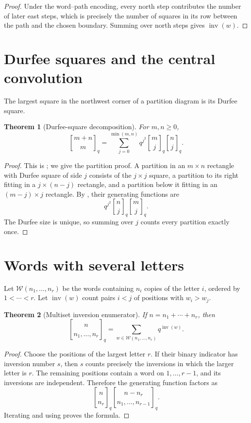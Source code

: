 \documentclass[11pt,oneside,openany]{book}
\newtheorem{theorem}{Theorem}[chapter]
\theoremstyle{definition}
\theoremstyle{remark}
\newcommand{\qbinom}[2]{\genfrac{[}{]}{0pt}{}{#1}{#2}_{q}}
\newcommand{\Qbinom}[3]{\genfrac{[}{]}{0pt}{}{#1}{#2}_{#3}}
\newcommand{\inv}{\operatorname{inv}}
\begin{document}
\begin{proof}
Under the word--path encoding, every north step contributes the number of later east steps, which is precisely the number of squares in its row between the path and the chosen boundary.  Summing over north steps gives $\inv(w)$.
\end{proof}

\section{Durfee squares and the central convolution}

The largest square in the northwest corner of a partition diagram is its Durfee square.

\begin{theorem}[Durfee-square decomposition]\label{thm:durfee-qvand}
For $m,n\ge0$,
\[
 \qbinom{m+n}{m}
 =\sum_{j=0}^{\min(m,n)}q^{j^2}\qbinom mj\qbinom nj.
\]
\end{theorem}

\begin{proof}
This is ; we give the partition proof.  A partition in an $m\times n$ rectangle with Durfee square of side $j$ consists of the $j\times j$ square, a partition to its right fitting in a $j\times(n-j)$ rectangle, and a partition below it fitting in an $(m-j)\times j$ rectangle.  By , their generating functions are
\[
 q^{j^2}\Qbinom{n}{j}{q}\Qbinom{m}{j}{q}.
\]
The Durfee size is unique, so summing over $j$ counts every partition exactly once.
\end{proof}

\section{Words with several letters}

Let $\mathcal W(n_1,\dots,n_r)$ be the words containing $n_i$ copies of the letter $i$, ordered by $1<\cdots<r$.  Let $\inv(w)$ count pairs $i<j$ of positions with $w_i>w_j$.

\begin{theorem}[Multiset inversion enumerator]\label{thm:qmult-inversions}
If $n=n_1+\cdots+n_r$, then
\[
 \genfrac{[}{]}{0pt}{}{n}{n_1,\dots,n_r}_q
 =\sum_{w\in\mathcal W(n_1,\dots,n_r)}q^{\inv(w)}.
\]
\end{theorem}

\begin{proof}
Choose the positions of the largest letter $r$.  If their binary indicator has inversion number $s$, then $s$ counts precisely the inversions in which the larger letter is $r$.  The remaining positions contain a word on $1,\dots,r-1$, and its inversions are independent.  Therefore the generating function factors as
\[
 \qbinom n{n_r}
 \genfrac{[}{]}{0pt}{}{n-n_r}{n_1,\dots,n_{r-1}}_q.
\]
Iterating and using  proves the formula.
\end{proof}
\end{document}
